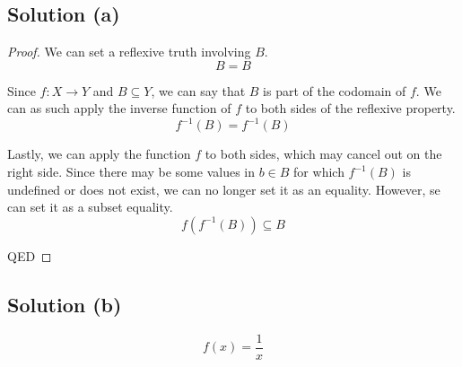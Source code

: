\documentclass[12pt]{report}
\begin{document}
\subsection{Solution (a)}
\begin{proof}
    We can set a reflexive truth involving $B$.
    \begin{equation}
        B = B
    \end{equation}

    Since $f: X \rightarrow Y$ and $B \subseteq Y$, we can say that $B$ is part of the codomain of $f$.
    We can as such apply the inverse function of $f$ to both sides of the reflexive property.
    \begin{equation}
        f^{-1}(B) = f^{-1}(B)
    \end{equation}

    Lastly, we can apply the function $f$ to both sides, which may cancel out on the right side. 
    Since there may be some values in $b \in B$ for which $f^{-1}(B)$ is undefined or does not exist, we can no longer set it as an equality. However, se can set it as a subset equality.
    \begin{equation}
        f(f^{-1}(B)) \subseteq B
    \end{equation}

    QED
\end{proof}

\subsection{Solution (b)}
\begin{equation}
    f(x) = \frac{1}{x}
\end{equation}

\pagebreak
\end{document}
